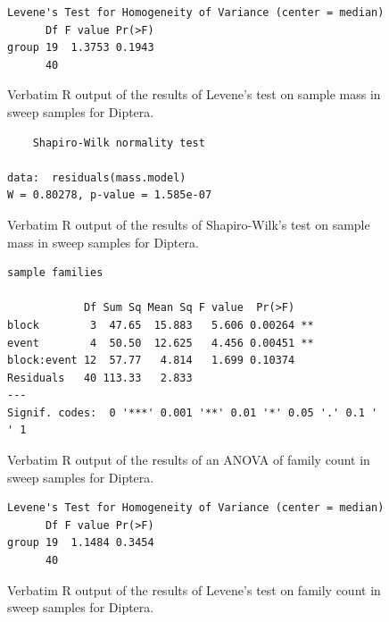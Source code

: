 \documentclass[10pt,letterpaper,twocolumn]{article}
\begin{document}
\begin{figure}[h]
	\lstset{numbers=left}
	\lstset{xleftmargin=5mm,framexleftmargin=5mm}
	\begin{lstlisting}
Levene's Test for Homogeneity of Variance (center = median)
      Df F value Pr(>F)
group 19  1.3753 0.1943
      40               
	\end{lstlisting}
	\caption{Verbatim R output of the results of Levene's test on sample mass in sweep samples for Diptera.}
	\label{fig:sweep_diptera_mass_levene}
	\smallskip
	\nointerlineskip
	\hrulefill
\end{figure}

\begin{figure}[h]
	\lstset{numbers=left}
	\lstset{xleftmargin=5mm,framexleftmargin=5mm}
	\begin{lstlisting}
	Shapiro-Wilk normality test

data:  residuals(mass.model)
W = 0.80278, p-value = 1.585e-07
	\end{lstlisting}
	\caption{Verbatim R output of the results of Shapiro-Wilk's test on sample mass in sweep samples for Diptera.}
	\label{fig:sweep_diptera_mass_shapiro}
	\smallskip
	\nointerlineskip
	\hrulefill
\end{figure}

\begin{figure}[h]
	\lstset{numbers=left}
	\lstset{xleftmargin=5mm,framexleftmargin=5mm}
	\begin{lstlisting}
sample families 

            Df Sum Sq Mean Sq F value  Pr(>F)   
block        3  47.65  15.883   5.606 0.00264 **
event        4  50.50  12.625   4.456 0.00451 **
block:event 12  57.77   4.814   1.699 0.10374   
Residuals   40 113.33   2.833                   
---
Signif. codes:  0 '***' 0.001 '**' 0.01 '*' 0.05 '.' 0.1 ' ' 1
	\end{lstlisting}
	\caption{Verbatim R output of the results of an ANOVA of family count in sweep samples for Diptera.}
	\label{fig:sweep_diptera_family_anova}
	\smallskip
	\nointerlineskip
	\hrulefill
\end{figure}

\begin{figure}[h]
	\lstset{numbers=left}
	\lstset{xleftmargin=5mm,framexleftmargin=5mm}
	\begin{lstlisting}
Levene's Test for Homogeneity of Variance (center = median)
      Df F value Pr(>F)
group 19  1.1484 0.3454
      40               
	\end{lstlisting}
	\caption{Verbatim R output of the results of Levene's test on family count in sweep samples for Diptera.}
	\label{fig:sweep_diptera_family_levene}
	\smallskip
	\nointerlineskip
	\hrulefill
\end{figure}
\end{document}
